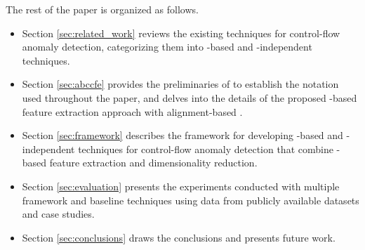 The rest of the paper is organized as follows.
\begin{itemize}
    \item Section \ref{sec:related_work} reviews the existing techniques for control-flow anomaly detection, categorizing them into -based and -independent techniques.
    \item Section \ref{sec:abccfe} provides the preliminaries of  to establish the notation used throughout the paper, and delves into the details of the proposed -based feature extraction approach with alignment-based .
    \item Section \ref{sec:framework} describes the framework for developing -based and -independent techniques for control-flow anomaly detection that combine -based feature extraction and dimensionality reduction.
    \item Section \ref{sec:evaluation} presents the experiments conducted with multiple framework and baseline techniques using data from publicly available datasets and case studies.
    \item Section \ref{sec:conclusions} draws the conclusions and presents future work.
\end{itemize}